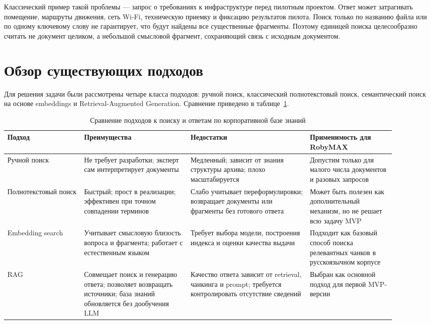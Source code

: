 Классический пример такой проблемы — запрос о требованиях к инфраструктуре перед пилотным проектом. Ответ может затрагивать помещение, маршруты движения, сеть Wi-Fi, техническую приемку и фиксацию результатов пилота. Поиск только по названию файла или по одному ключевому слову не гарантирует, что будут найдены все существенные фрагменты. Поэтому единицей поиска целесообразно считать не документ целиком, а небольшой смысловой фрагмент, сохраняющий связь с исходным документом.

\section{Обзор существующих подходов}

Для решения задачи были рассмотрены четыре класса подходов: ручной поиск, классический полнотекстовый поиск, семантический поиск на основе embeddings и Retrieval-Augmented Generation. Сравнение приведено в таблице~\ref{tbl:approaches}.

\begin{table}[h]
\caption{Сравнение подходов к поиску и ответам по корпоративной базе знаний}
\label{tbl:approaches}
\centering
\small
\begin{tabular}{|p{0.18\linewidth}|p{0.25\linewidth}|p{0.28\linewidth}|p{0.20\linewidth}|}
\hline
Подход & Преимущества & Недостатки & Применимость для RobyMAX \\
\hline
Ручной поиск & Не требует разработки; эксперт сам интерпретирует документы & Медленный; зависит от знания структуры архива; плохо масштабируется & Допустим только для малого числа документов и разовых запросов \\
\hline
Полнотекстовый поиск & Быстрый; прост в реализации; эффективен при точном совпадении терминов & Слабо учитывает переформулировки; возвращает документы или фрагменты без готового ответа & Может быть полезен как дополнительный механизм, но не решает всю задачу MVP \\
\hline
Embedding search & Учитывает смысловую близость вопроса и фрагмента; работает с естественным языком & Требует выбора модели, построения индекса и оценки качества выдачи & Подходит как базовый способ поиска релевантных чанков в русскоязычном корпусе \\
\hline
RAG & Совмещает поиск и генерацию ответа; позволяет возвращать источники; база знаний обновляется без дообучения LLM & Качество ответа зависит от retrieval, чанкинга и prompt; требуется контролировать отсутствие сведений & Выбран как основной подход для первой MVP-версии \\
\hline
\end{tabular}
\end{table}

